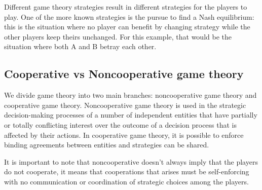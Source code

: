 Different game theory strategies result in different strategies for the players to play. One of the more known strategies is the pursue to find a Nash equilibrium: this is the situation where no player can benefit by changing strategy while the other players keep theirs unchanged. For this example, that would be the situation where both A and B betray each other.    

\subsection{Cooperative vs Noncooperative game theory}
We divide game theory into two main branches: noncooperative game theory and cooperative game theory. Noncooperative game theory is used in the strategic decision-making processes of a number of independent entities that have partially or totally conflicting interest over the outcome of a decision process that is affected by their actions.  In cooperative game theory, it is possible to enforce binding agreements between entities and strategies can be shared. 

It is important to note that noncooperative doesn't always imply that the players do not cooperate, it means that cooperations that arises must be self-enforcing with no communication or coordination of strategic choices among the players.   
